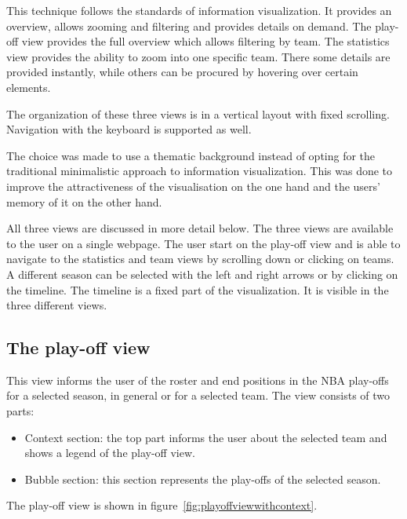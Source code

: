 \documentclass[chi_draft]{sigchi}
\begin{document}
This technique follows the standards of information visualization. It provides
an overview, allows zooming and filtering and provides details on
demand\cite{mantra,multipleviews,automatingdesign}. The play-off view provides
the full overview which allows filtering by team. The statistics view provides
the ability to zoom into one specific team. There some details are provided
instantly, while others can be procured by hovering over certain elements.

The organization of these three views is in a vertical layout with fixed
scrolling. Navigation with the keyboard is supported as well. 

The choice was made to use a thematic background instead of opting for the
traditional minimalistic approach to information visualization. This was done to
improve the attractiveness of the visualisation on the one hand and the users'
memory of it on the other hand\cite{aesthetics}. 

All three views are discussed in more detail below. The three views are
available to the user on a single webpage. The user start on the play-off view
and is able to navigate to the statistics and team views by scrolling down or
clicking on teams. A different season can be selected with the left and right
arrows or by clicking on the timeline. The timeline is a fixed part of the
visualization. It is visible in the three different views.

\subsection{The play-off view}
This view informs the user of the roster and end positions in the NBA play-offs
for a selected season, in general or for a selected team. The view consists of
two parts: 
\begin{itemize}
    \item Context section: the top part informs the user about the selected team
    and shows a legend of the play-off view.
    \item Bubble section: this section represents the play-offs of the selected
        season.
\end{itemize}
The play-off view is shown in figure~\ref{fig:playoffviewwithcontext}.
\end{document}
